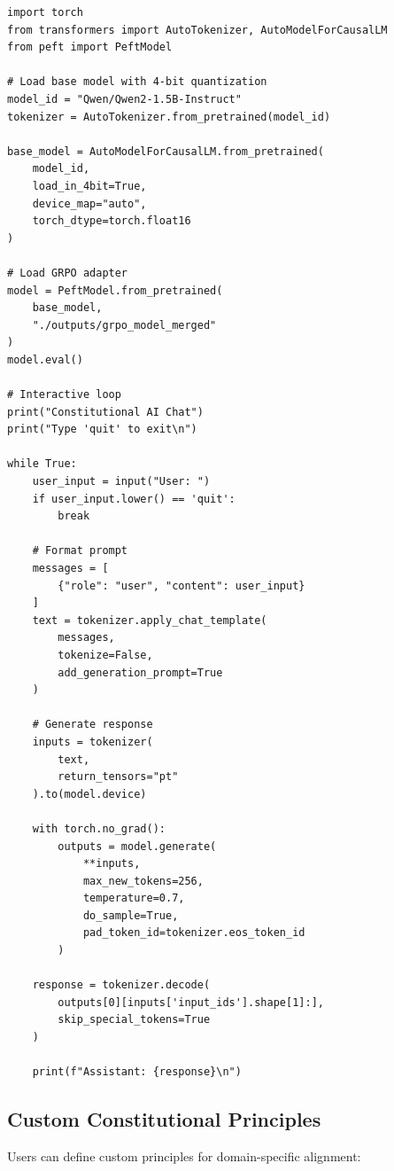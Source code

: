 \documentclass[conference]{IEEEtran}
\begin{document}
\begin{lstlisting}[caption={Interactive Inference with Trained Model}]
import torch
from transformers import AutoTokenizer, AutoModelForCausalLM
from peft import PeftModel

# Load base model with 4-bit quantization
model_id = "Qwen/Qwen2-1.5B-Instruct"
tokenizer = AutoTokenizer.from_pretrained(model_id)

base_model = AutoModelForCausalLM.from_pretrained(
    model_id,
    load_in_4bit=True,
    device_map="auto",
    torch_dtype=torch.float16
)

# Load GRPO adapter
model = PeftModel.from_pretrained(
    base_model,
    "./outputs/grpo_model_merged"
)
model.eval()

# Interactive loop
print("Constitutional AI Chat")
print("Type 'quit' to exit\n")

while True:
    user_input = input("User: ")
    if user_input.lower() == 'quit':
        break
    
    # Format prompt
    messages = [
        {"role": "user", "content": user_input}
    ]
    text = tokenizer.apply_chat_template(
        messages,
        tokenize=False,
        add_generation_prompt=True
    )
    
    # Generate response
    inputs = tokenizer(
        text,
        return_tensors="pt"
    ).to(model.device)
    
    with torch.no_grad():
        outputs = model.generate(
            **inputs,
            max_new_tokens=256,
            temperature=0.7,
            do_sample=True,
            pad_token_id=tokenizer.eos_token_id
        )
    
    response = tokenizer.decode(
        outputs[0][inputs['input_ids'].shape[1]:],
        skip_special_tokens=True
    )
    
    print(f"Assistant: {response}\n")
\end{lstlisting}

\subsection{Custom Constitutional Principles}

Users can define custom principles for domain-specific alignment:
\end{document}
